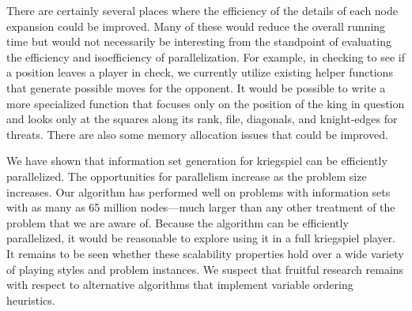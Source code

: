 \documentclass[times, 10pt,twocolumn]{article}
\begin{document}
There are certainly several places where the efficiency of the details of each node expansion could be improved.  Many
of these would reduce the overall running time but would not necessarily be interesting from the standpoint of
evaluating the efficiency and isoefficiency of parallelization.  For example, in checking to see if a position leaves a
player in check, we currently utilize existing helper functions that generate possible moves for the opponent.  It would
be possible to write a more specialized function that focuses only on the position of the king in question and looks
only at the squares along its rank, file, diagonals, and knight-edges for threats.  There are also some memory
allocation issues that could be improved. 

We have shown that information set generation for kriegspiel can be efficiently parallelized.  The opportunities for
parallelism increase as the problem size increases.  Our algorithm has performed well on problems with information sets
with as many as 65 million nodes---much larger than any other treatment of the problem that we are aware of.  Because
the algorithm can be efficiently parallelized, it would be reasonable to explore using it in a full kriegspiel player.
It remains to be seen whether these scalability properties hold over a wide variety of playing styles and problem
instances.  We suspect that fruitful research remains with respect to alternative algorithms that implement variable
ordering heuristics.
\end{document}
